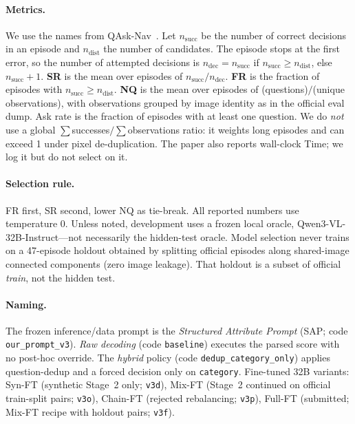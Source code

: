 \documentclass[10pt,a4paper]{article}
\begin{document}
\paragraph{Metrics.}
We use the names from QAsk-Nav~\cite{zorzi2026coinqa}. Let
$n_{\mathrm{succ}}$ be the number of correct decisions in an episode and
$n_{\mathrm{dist}}$ the number of candidates. The episode stops at the
first error, so the number of attempted decisions is
$n_{\mathrm{dec}}=n_{\mathrm{succ}}$ if
$n_{\mathrm{succ}}\ge n_{\mathrm{dist}}$, else $n_{\mathrm{succ}}+1$.
\textbf{SR} is the mean over episodes of $n_{\mathrm{succ}}/n_{\mathrm{dec}}$.
\textbf{FR} is the fraction of episodes with
$n_{\mathrm{succ}}\ge n_{\mathrm{dist}}$.
\textbf{NQ} is the mean over episodes of (questions)$/$(unique
observations), with observations grouped by image identity as in the
official eval dump. Ask rate is the fraction of episodes with at least
one question. We do \emph{not} use a global
$\sum$successes$/\sum$observations ratio: it weights long episodes and
can exceed 1 under pixel de-duplication. The paper also reports
wall-clock Time; we log it but do not select on it.

\paragraph{Selection rule.}
FR first, SR second, lower NQ as tie-break. All reported numbers use
temperature 0. Unless noted, development uses a frozen local oracle,
Qwen3-VL-32B-Instruct---not necessarily the hidden-test oracle.
Model selection never trains on a 47-episode holdout obtained by
splitting official episodes along shared-image connected components
(zero image leakage). That holdout is a subset of official \emph{train},
not the hidden test.

\paragraph{Naming.}
The frozen inference/data prompt is the \emph{Structured Attribute
Prompt} (SAP; code \texttt{our\_prompt\_v3}).
\emph{Raw decoding} (code \texttt{baseline}) executes the parsed score
with no post-hoc override.
The \emph{hybrid} policy (code \texttt{dedup\_category\_only}) applies
question-dedup and a forced decision only on \texttt{category}.
Fine-tuned 32B variants: Syn-FT (synthetic Stage~2 only; \texttt{v3d}),
Mix-FT (Stage~2 continued on official train-split pairs; \texttt{v3o}),
Chain-FT (rejected rebalancing; \texttt{v3p}), Full-FT (submitted;
Mix-FT recipe with holdout pairs; \texttt{v3f}).
\end{document}
